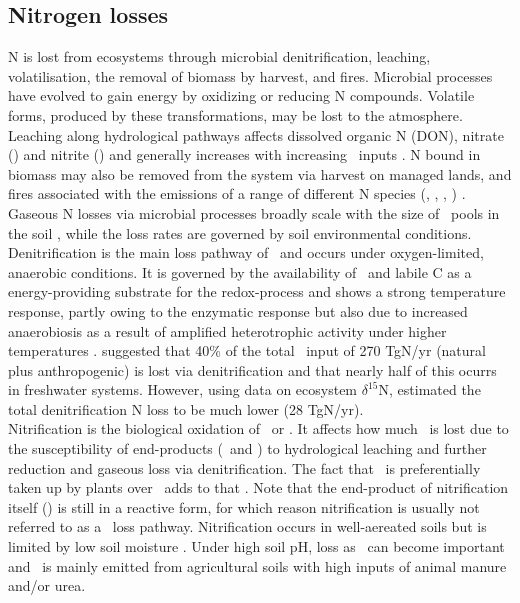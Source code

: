 \subsection{Nitrogen losses}
\label{sec:nlosses}
N is lost from ecosystems through microbial denitrification, leaching, volatilisation, the removal of biomass by harvest, and fires. Microbial processes have evolved to gain energy by oxidizing or reducing N compounds. Volatile forms, produced by these transformations, may be lost to the atmosphere. Leaching along hydrological pathways affects dissolved organic N (DON), nitrate (\nooo ) and nitrite (\noo ) and generally increases with increasing \nr\ inputs \citep{ena}. N bound in biomass may also be removed from the system via harvest on managed lands, and fires associated with the emissions of a range of different N species (\nn , \nox , \nno , \nhhh ) \citep{ena}.\\

Gaseous N losses via microbial processes broadly scale with the size of \nr\ pools in the soil \citep{esser11}, while the loss rates are governed by soil environmental conditions. Denitrification is the main loss pathway of \nr\ and occurs under oxygen-limited, anaerobic conditions. It is governed by the availability of \nooo\ and labile C as a energy-providing substrate for the redox-process and shows a strong temperature response, partly owing to the enzymatic response but also due to increased anaerobiosis as a result of amplified heterotrophic activity under higher temperatures \citep{butterbachbahl11}. \citet{seitzinger06} suggested that 40\% of the total \nr\ input of 270 TgN/yr (natural plus anthropogenic) is lost via denitrification and that nearly half of this ocurrs in freshwater systems. However, using data on ecosystem $\delta^{15}$N, \citet{houltonbai09} estimated the total denitrification N loss to be much lower (28 TgN/yr).\\

Nitrification is the biological oxidation of \nhhhh\ or \nhhh . It affects how much \nr\ is lost due to the susceptibility of end-products (\nooo\ and \noo ) to hydrological leaching and further reduction and gaseous loss via denitrification. The fact that \nhhhh\ is preferentially taken up by plants over \nooo\ adds to that \citep{ena}. Note that the end-product of nitrification itself (\nooo ) is still in a reactive form, for which reason nitrification is usually not referred to as a \nr\ loss pathway. Nitrification occurs in well-aereated soils but is limited by low soil moisture \citep{barnard05}. Under high soil pH, loss as \nhhh\ can become important and \nhhh\ is mainly emitted from agricultural soils with high inputs of animal manure and/or urea.\\


